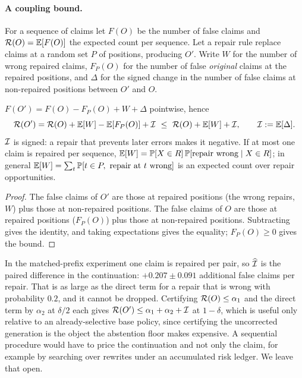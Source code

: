 \paragraph{A coupling bound.}
For a sequence of claims let $F(O)$ be the number of false claims and $\mathcal{R}(O)=\mathbb{E}[F(O)]$ the expected count per
sequence. Let a repair rule replace claims at a random set $P$ of positions, producing $O'$.
Write $W$ for the number of wrong repaired claims, $F_P(O)$ for the number of false \emph{original} claims at the
repaired positions, and $\Delta$ for the signed change in the number of false claims at non-repaired positions
between $O'$ and $O$.

\begin{theorem}
\label{thm:coupling}
$F(O')=F(O)-F_P(O)+W+\Delta$ pointwise, hence
\[
\Risk(O')=\Risk(O)+\E[W]-\E[F_P(O)]+\Iota\ \le\ \Risk(O)+\E[W]+\Iota,\qquad \Iota:=\E[\Delta].
\]
$\mathcal{I}$ is signed: a repair that prevents later errors makes it negative. If at most one claim is repaired per
sequence, $\mathbb{E}[W]=\mathbb{P}[X\in R]\,\mathbb{P}[\text{repair wrong}\mid X\in R]$; in general $\mathbb{E}[W]=\sum_t\mathbb{P}[t\in P,\ \text{repair at }t\text{ wrong}]$ is an expected
count over repair opportunities.
\end{theorem}
\begin{proof}
The false claims of $O'$ are those at repaired positions (the wrong repairs, $W$) plus those at non-repaired positions. The false claims of $O$ are
those at repaired positions ($F_P(O)$) plus those at non-repaired positions. Subtracting gives the identity, and taking
expectations gives the equality; $F_P(O)\ge0$ gives the bound.
\end{proof}

In the matched-prefix experiment one claim is repaired per pair, so $\widehat{\mathcal{I}}$ is the paired difference in
the continuation: $+0.207\pm0.091$ additional false claims per repair. That is as large as the direct term for a
repair that is wrong with probability $0.2$, and it cannot be dropped. Certifying $\mathcal{R}(O)\le\alpha_1$ and the direct term by
$\alpha_2$ at $\delta/2$ each gives $\mathcal{R}(O')\le\alpha_1+\alpha_2+\mathcal{I}$ at $1-\delta$, which is useful only
relative to an already-selective base policy, since certifying the uncorrected generation is the object the
abstention floor makes expensive. A sequential procedure would have to price the continuation and not only the claim,
for example by searching over rewrites under an accumulated risk ledger. We leave that open.
